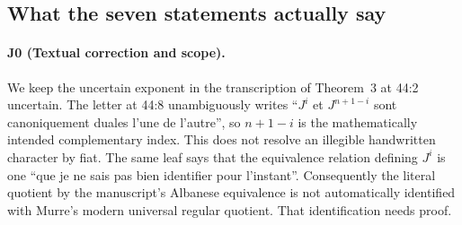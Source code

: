 \subsection{What the seven statements actually say}
\paragraph{J0 (Textual correction and scope).}
We keep the uncertain exponent in the transcription of Theorem~3
at 44:2 uncertain.  The letter at 44:8 unambiguously writes
``$J^i$ et $J^{n+1-i}$ sont canoniquement duales l'une de l'autre'',
so $n+1-i$ is the mathematically intended complementary index.
This does not resolve an illegible handwritten character by fiat.
The same leaf says that the equivalence relation defining $J^i$ is
one ``que je ne sais pas bien identifier pour l'instant''.
Consequently the literal quotient by the manuscript's Albanese
equivalence is not automatically identified with Murre's modern
universal regular quotient.  That identification needs proof.

